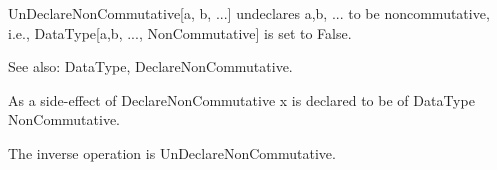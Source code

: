 


UnDeclareNonCommutative[a, b, ...] undeclares a,b, ... to be noncommutative, i.e., DataType[a,b, ..., NonCommutative] is set to False.

See also:  DataType, DeclareNonCommutative.



As a side-effect of DeclareNonCommutative x is declared to be of DataType NonCommutative.



The inverse operation is UnDeclareNonCommutative.


